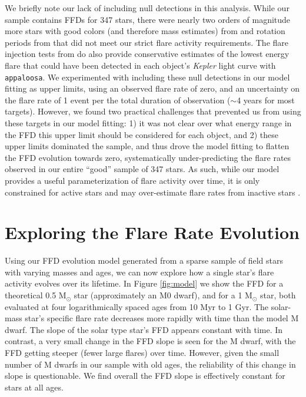 \documentclass[preprint2]{aastex62}
\newcommand{\Kepler}{\textsl{Kepler}\xspace}
\begin{document}
We briefly note our lack of including null detections in this analysis. While our sample contains FFDs for 347 stars, there were nearly two orders of magnitude more stars with good colors (and therefore mass estimates) from \citet{davenport2016} and rotation periods from \citet{mcquillan2014} that did not meet our strict flare activity requirements. The flare injection tests from \citet{davenport2016} do also provide conservative estimates of the lowest energy flare that could have been detected in each object's \Kepler light curve with {\tt appaloosa}. We experimented with including these null detections in our model fitting as upper limits, using an observed flare rate of zero, and an uncertainty on the flare rate of 1 event per the total duration of observation ($\sim$4 years for most targets). However, we found two practical challenges that prevented us from using these targets in our model fitting: 1) it was not clear over what energy range in the FFD this upper limit should be considered for each object, and 2) these upper limits dominated the sample, and thus drove the model fitting to flatten the FFD evolution towards zero, systematically under-predicting the flare rates observed in our entire ``good'' sample of 347 stars. 
As such, while our model provides a useful parameterization of flare activity over time, it is only constrained for active stars and may over-estimate flare rates from inactive stars \citep[e.g.][]{hawley2014}. 


\section{Exploring the Flare Rate Evolution}
\label{sec:model}


Using our FFD evolution model generated from a sparse sample of field stars with varying masses and ages, we can now explore how a single star's flare activity evolves over its lifetime. In Figure \ref{fig:model} we show the FFD for a theoretical 0.5 M$_\odot$ star (approximately an M0 dwarf), and for a 1 M$_\odot$ star, both evaluated at four logarithmically spaced ages from 10 Myr to 1 Gyr. The solar-mass star's specific flare rate decreases more rapidly with time than the model M dwarf. The slope of the solar type star's FFD appears constant with time. In contrast, a very small change in the FFD slope is seen for the M dwarf, with the FFD getting steeper (fewer large flares) over time. However, given the small number of M dwarfs in our sample with old ages, the reliability of this change in slope is questionable. We find overall the FFD slope is effectively constant for stars at all ages.
\end{document}
